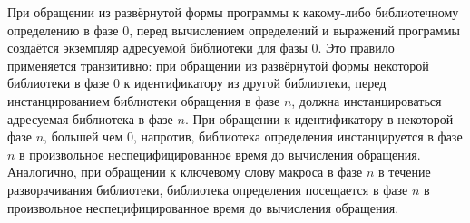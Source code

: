 При обращении из развёрнутой формы программы к какому-либо библиотечному определению в фазе $0$,
перед вычислением определений и выражений программы создаётся экземпляр адресуемой библиотеки
для фазы $0$. Это правило применяется транзитивно: при обращении из развёрнутой формы некоторой
библиотеки в фазе $0$ к идентификатору из другой библиотеки, перед инстанцированием библиотеки
обращения в фазе $n$, должна инстанцироваться адресуемая библиотека в фазе $n$. При обращении к
идентификатору в некоторой фазе $n$, большей чем $0$, напротив, библиотека определения
инстанцируется в фазе $n$ в произвольное неспецифицированное время до вычисления
обращения. Аналогично, при обращении к ключевому слову макроса в фазе $n$ в течение разворачивания
библиотеки, библиотека определения посещается в фазе $n$ в произвольное неспецифицированное
время до вычисления обращения.

